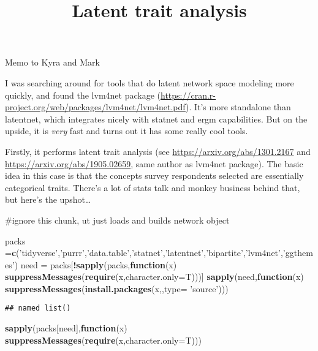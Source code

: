 \documentclass[
]{article}
\title{Latent trait analysis}
\author{}
\date{\vspace{-2.5em}}
\newenvironment{Shaded}{\begin{snugshade}}{\end{snugshade}}
\newcommand{\ControlFlowTok}[1]{\textcolor[rgb]{0.13,0.29,0.53}{\textbf{#1}}}
\newcommand{\DataTypeTok}[1]{\textcolor[rgb]{0.13,0.29,0.53}{#1}}
\newcommand{\KeywordTok}[1]{\textcolor[rgb]{0.13,0.29,0.53}{\textbf{#1}}}
\newcommand{\NormalTok}[1]{#1}
\newcommand{\OperatorTok}[1]{\textcolor[rgb]{0.81,0.36,0.00}{\textbf{#1}}}
\newcommand{\StringTok}[1]{\textcolor[rgb]{0.31,0.60,0.02}{#1}}
\begin{document}
\maketitle

Memo to Kyra and Mark

I was searching around for tools that do latent network space modeling
more quickly, and found the lvm4net package
(\url{https://cran.r-project.org/web/packages/lvm4net/lvm4net.pdf}).
It's more standalone than latentnet, which integrates nicely with
statnet and ergm capabilities. But on the upside, it is \emph{very} fast
and turns out it has some really cool tools.

Firstly, it performs latent trait analysis (see
\url{https://arxiv.org/abs/1301.2167} and
\url{https://arxiv.org/abs/1905.02659}, same author as lvm4net package).
The basic idea in this case is that the concepts survey respondents
selected are essentially categorical traits. There's a lot of stats talk
and monkey business behind that, but here's the upshot\ldots{}

\#ignore this chunk, ut just loads and builds network object

\begin{Shaded}
\begin{Highlighting}[]
\NormalTok{packs =}\KeywordTok{c}\NormalTok{(}\StringTok{'tidyverse'}\NormalTok{,}\StringTok{'purrr'}\NormalTok{,}\StringTok{'data.table'}\NormalTok{,}\StringTok{'statnet'}\NormalTok{,}\StringTok{'latentnet'}\NormalTok{,}\StringTok{'bipartite'}\NormalTok{,}\StringTok{'lvm4net'}\NormalTok{,}\StringTok{'ggthemes'}\NormalTok{)}
\NormalTok{need =}\StringTok{ }\NormalTok{packs[}\OperatorTok{!}\KeywordTok{sapply}\NormalTok{(packs,}\ControlFlowTok{function}\NormalTok{(x) }\KeywordTok{suppressMessages}\NormalTok{(}\KeywordTok{require}\NormalTok{(x,}\DataTypeTok{character.only=}\NormalTok{T)))]}
\KeywordTok{sapply}\NormalTok{(need,}\ControlFlowTok{function}\NormalTok{(x) }\KeywordTok{suppressMessages}\NormalTok{(}\KeywordTok{install.packages}\NormalTok{(x,,}\DataTypeTok{type=} \StringTok{'source'}\NormalTok{)))}
\end{Highlighting}
\end{Shaded}

\begin{verbatim}
## named list()
\end{verbatim}

\begin{Shaded}
\begin{Highlighting}[]
\KeywordTok{sapply}\NormalTok{(packs[need],}\ControlFlowTok{function}\NormalTok{(x) }\KeywordTok{suppressMessages}\NormalTok{(}\KeywordTok{require}\NormalTok{(x,}\DataTypeTok{character.only=}\NormalTok{T)))}
\end{Highlighting}
\end{Shaded}
\end{document}
